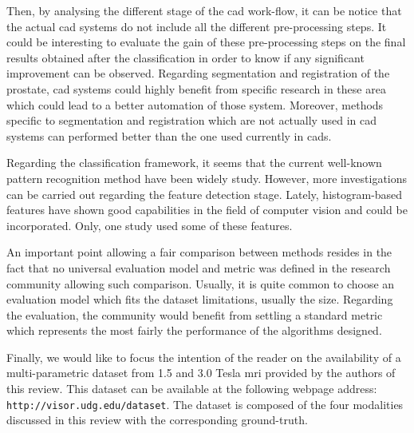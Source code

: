 Then, by analysing the different stage of the \ac{cad} work-flow, it can be notice that the actual \ac{cad} systems do not include all the different pre-processing steps. It could be interesting to evaluate the gain of these pre-processing steps on the final results obtained after the classification in order to know if any significant improvement can be observed. Regarding segmentation and registration of the prostate, \ac{cad} systems could highly benefit from specific research in these area which could lead to a better automation of those system. Moreover, methods specific to segmentation and registration which are not actually used in \ac{cad} systems can performed better than the one used currently in \acp{cad}.

Regarding the classification framework, it seems that the current well-known pattern recognition method have been widely study. However, more investigations can be carried out regarding the feature detection stage. Lately, histogram-based features have shown good capabilities in the field of computer vision and could be incorporated. Only, one study \cite{Liu2013} used some of these features.

An important point allowing a fair comparison between methods resides in the fact that no universal evaluation model and metric was defined in the research community allowing such comparison. Usually, it is quite common to choose an evaluation model which fits the dataset limitations, usually the size. Regarding the evaluation, the community would benefit from settling a standard metric which represents the most fairly the performance of the algorithms designed.

Finally, we would like to focus the intention of the reader on the availability of a multi-parametric dataset from 1.5 and 3.0 Tesla \ac{mri} provided by the authors of this review. This dataset can be available at the following webpage address: \texttt{http://visor.udg.edu/dataset}. The dataset is composed of the four modalities discussed in this review with the corresponding ground-truth.